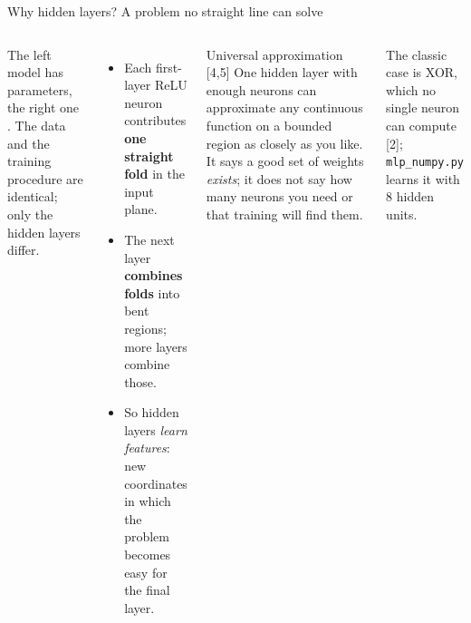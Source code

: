 \documentclass[aspectratio=169,10pt]{beamer}
\renewcommand{\cite}[1]{{\scriptsize\color{cTok}[#1]}}
\begin{document}
\begin{frame}{Why hidden layers? A problem no straight line can solve}
\begin{columns}[T,onlytextwidth]
\vspace{1.5mm}
\raggedright\small
The left model has \moonsLinearParams{} parameters, the right one \moonsMlpParams. The data and the
training procedure are identical; only the hidden layers differ.
\small
\begin{itemize}
  \item Each first-layer ReLU neuron contributes \textbf{one straight fold} in the input plane.
  \item The next layer \textbf{combines folds} into bent regions; more layers combine those.
  \item So hidden layers \emph{learn features}: new coordinates in which the problem becomes
        easy for the final layer.
\end{itemize}
\begin{block}{Universal approximation \cite{4,5}}
\footnotesize
One hidden layer with enough neurons can approximate any continuous function on a bounded region
as closely as you like. It says a good set of weights \emph{exists}; it does not say how many
neurons you need or that training will find them.
\end{block}
{\footnotesize The classic case is XOR, which no single neuron can compute \cite{2};
\texttt{mlp\_numpy.py} learns it with 8 hidden units.}
\end{columns}
\end{frame}
\end{document}
